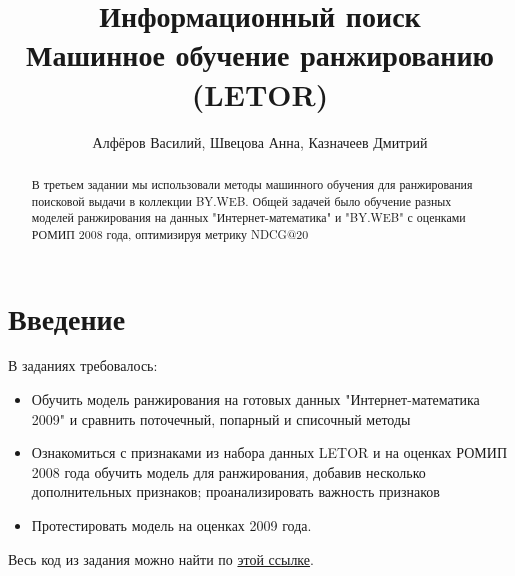 \documentclass[twocolumn]{extarticle}
\title{Информационный поиск\\ Машинное обучение ранжированию (LETOR)}
\author{Алфёров Василий, Швецова Анна, Казначеев Дмитрий}
\begin{document}
\maketitle

\begin{abstract}
    В третьем задании мы использовали методы машинного обучения для ранжирования поисковой выдачи в коллекции BY.WEB. Общей задачей было обучение разных моделей ранжирования на данных "Интернет-математика" и "BY.WEB" с оценками РОМИП 2008 года, оптимизируя метрику NDCG@20
\end{abstract}

\section{Введение}

В заданиях требовалось:

\begin{itemize}
\item Обучить модель ранжирования на готовых данных "Интернет-математика 2009" и сравнить поточечный, попарный и списочный методы
\item Ознакомиться с признаками из набора данных LETOR и на оценках РОМИП 2008 года обучить модель для ранжирования, добавив несколько дополнительных признаков; проанализировать важность признаков
\item Протестировать модель на оценках 2009 года.
\end{itemize}

Весь код из задания можно найти по 
\href{https://github.com/vasalf/hse-web-search-homework/tree/master/3}{этой ссылке}.




\end{document}
